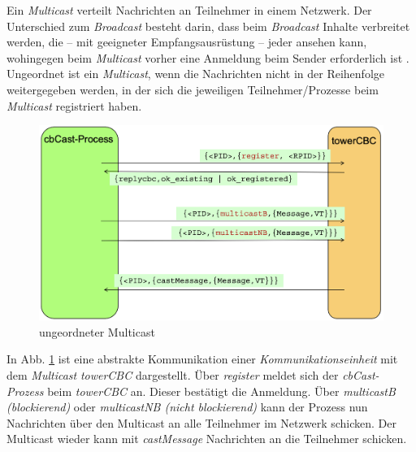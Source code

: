 Ein \textit{Multicast} verteilt Nachrichten an Teilnehmer in einem Netzwerk. Der Unterschied zum \textit{Broadcast} besteht darin, dass beim \textit{Broadcast} Inhalte verbreitet werden, die – mit geeigneter Empfangsausrüstung – jeder ansehen kann, wohingegen beim \textit{Multicast} vorher eine Anmeldung beim Sender erforderlich ist \cite{wiki:Multicast}.\\
Ungeordnet ist ein \textit{Multicast}, wenn die Nachrichten nicht in der Reihenfolge weitergegeben werden, in der sich die jeweiligen Teilnehmer/Prozesse beim \textit{Multicast} registriert haben.

\begin{figure}[htbp]
\begin{center}
\includegraphics[scale=0.4]{Latex/Bilder/towerCBC_1.png}
\caption{\label{fig:towerCBC} ungeordneter Multicast \cite{Aufgabenstellung}} 
\end{center}
\end{figure}

In Abb. \ref{fig:towerCBC} ist eine abstrakte Kommunikation einer \textit{Kommunikationseinheit} mit dem \textit{Multicast} \textit{towerCBC} dargestellt. Über \textit{register} meldet sich der \textit{cbCast-Prozess} beim \textit{towerCBC} an. Dieser bestätigt die Anmeldung. Über \textit{multicastB (blockierend)} oder \textit{multicastNB (nicht blockierend)} kann der Prozess nun Nachrichten über den Multicast an alle Teilnehmer im Netzwerk schicken. Der Multicast wieder kann mit \textit{castMessage} Nachrichten an die Teilnehmer schicken.

